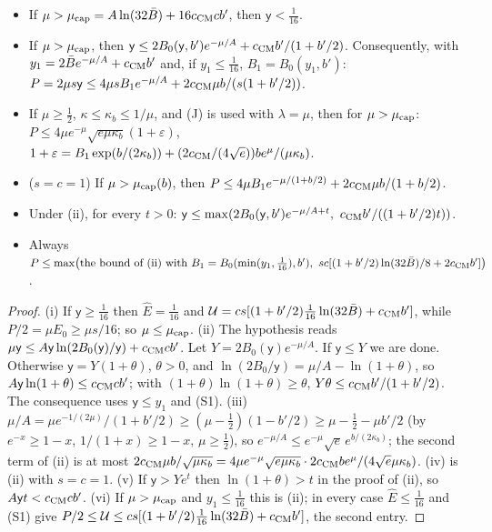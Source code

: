 \begin{lemma} \proofst
\label{lem:DIgen}
\begin{itemize}
\item[(i)] If $\mu>\mu_{\rm cap}=A\ln(32\bar B)+16c_{\rm CM}cb'$, then $\mathsf y<\frac1{16}$.
\item[(ii)] If $\mu>\mu_{\rm cap}$, then $\mathsf y\le2B_0(\mathsf y,b')e^{-\mu/A}+c_{\rm CM}b'/(1+b'/2)$. Consequently, with $y_1=2\bar Be^{-\mu/A}+c_{\rm CM}b'$ and, if $y_1\le\frac1{16}$, $B_1=B_0(y_1,b')$:
$P=2\mu s\mathsf y\le4\mu sB_1e^{-\mu/A}+2c_{\rm CM}\mu b/(s(1+b'/2))$.
\item[(iii)] If $\mu\ge\frac12$, $\kappa\le\kappa_b\le1/\mu$, and (J) is used with $\lambda=\mu$, then for $\mu>\mu_{\rm cap}$:
$P\le4\mu e^{-\mu}\sqrt{e\mu\kappa_b}(1+\varepsilon)$, $1+\varepsilon=B_1\exp(b/(2\kappa_b))+(2c_{\rm CM}/(4\sqrt e))be^{\mu}/(\mu\kappa_b)$.
\item[(iv)] ($s=c=1$) If $\mu>\mu_{\rm cap}(b)$, then $P\le4\mu B_1e^{-\mu/(1+b/2)}+2c_{\rm CM}\mu b/(1+b/2)$.
\item[(v)] Under (ii), for every $t>0$: $\mathsf y\le\max(2B_0(\mathsf y,b')e^{-\mu/A+t},\ c_{\rm CM}b'/((1+b'/2)t))$.
\item[(vi)] Always $P\le\max\bigl(\text{the bound of (ii) with }B_1=B_0(\min(y_1,\frac1{16}),b'),\ sc[(1+b'/2)\ln(32\bar B)/8+2c_{\rm CM}b']\bigr)$.
\end{itemize}
\end{lemma}
\begin{proof}
(i) If $\mathsf y\ge\frac1{16}$ then $\hat E=\frac1{16}$ and $\mathcal U=cs[(1+b'/2)\frac1{16}\ln(32\bar B)+c_{\rm CM}b']$, while $P/2=\mu E_0\ge\mu s/16$; so $\mu\le\mu_{\rm cap}$.
(ii) The hypothesis reads $\mu\mathsf y\le A\mathsf y\ln(2B_0(\mathsf y)/\mathsf y)+c_{\rm CM}cb'$. Let $Y=2B_0(\mathsf y)e^{-\mu/A}$. If $\mathsf y\le Y$ we are done. Otherwise $\mathsf y=Y(1+\theta)$, $\theta>0$, and $\ln(2B_0/\mathsf y)=\mu/A-\ln(1+\theta)$, so $A\mathsf y\ln(1+\theta)\le c_{\rm CM}cb'$; with $(1+\theta)\ln(1+\theta)\ge\theta$, $Y\theta\le c_{\rm CM}b'/(1+b'/2)$. The consequence uses $\mathsf y\le y_1$ and (S1).
(iii) $\mu/A=\mu e^{-1/(2\mu)}/(1+b'/2)\ge(\mu-\frac12)(1-b'/2)\ge\mu-\frac12-\mu b'/2$ (by $e^{-x}\ge1-x$, $1/(1+x)\ge1-x$, $\mu\ge\frac12$), so $e^{-\mu/A}\le e^{-\mu}\sqrt e\,e^{b/(2\kappa_b)}$; the second term of (ii) is at most $2c_{\rm CM}\mu b/\sqrt{\mu\kappa_b}=4\mu e^{-\mu}\sqrt{e\mu\kappa_b}\cdot2c_{\rm CM}be^{\mu}/(4\sqrt e\mu\kappa_b)$.
(iv) is (ii) with $s=c=1$.
(v) If $\mathsf y>Ye^t$ then $\ln(1+\theta)>t$ in the proof of (ii), so $A\mathsf yt<c_{\rm CM}cb'$.
(vi) If $\mu>\mu_{\rm cap}$ and $y_1\le\frac1{16}$ this is (ii); in every case $\hat E\le\frac1{16}$ and (S1) give $P/2\le\mathcal U\le cs[(1+b'/2)\frac1{16}\ln(32\bar B)+c_{\rm CM}b']$, the second entry.
\end{proof}


